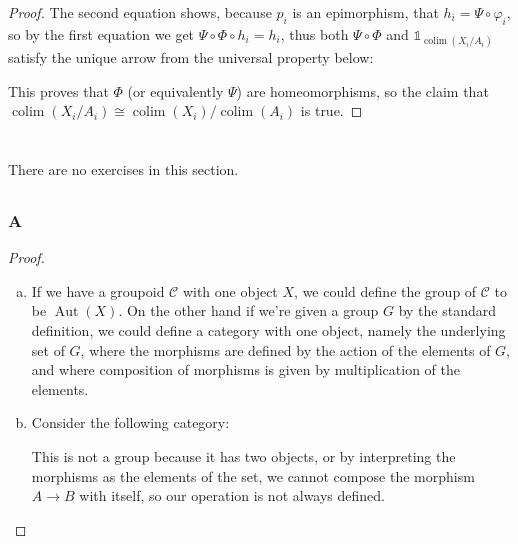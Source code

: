 \documentclass{article}
\newcommand{\altid}{\mathds{1}}
\DeclareMathOperator{\colim}{\mathrm{colim}}
\DeclareMathOperator{\Aut}{\mathrm{Aut}}
\begin{document}
\begin{proof}
    The second equation shows, because $p_i$ is an epimorphism, that $h_i=\Psi \circ \varphi_i$, so by the first equation we get $\Psi \circ \Phi\circ h_i=h_i$, thus both $\Psi \circ \Phi$ and $\altid_{\colim(X_i/A_i)}$ satisfy the unique arrow from the universal property below:
    \begin{center}
    \end{center}
    This proves that $\Phi$ (or equivalently $\Psi$) are homeomorphisms, so the claim that $\colim (X_i/A_i)\cong \colim (X_i)/\colim(A_i)$ is true.
    \end{proof}
\section{}
\subsection{}
There are no exercises in this section.
\subsection{}
\subsubsection{A}\label{1.2.A}
\begin{proof}
\begin{enumerate}[(a)]
    \item If we have a groupoid $\mathscr{C}$ with one object $X$, we could define the group of $\mathcal{C}$ to be $\Aut(X)$. On the other hand if we're given a group $G$ by the standard definition, we could define a category with one object, namely the underlying set of $G$, where the morphisms are defined by the action of the elements of $G$, and where composition of morphisms is given by multiplication of the elements.
    \item Consider the following category:
    \begin{center}
    \end{center}
    This is not a group because it has two objects, or by interpreting the morphisms as the elements of the set, we cannot compose the morphism $A\to B$ with itself, so our operation is not always defined.
\end{enumerate}
\end{proof}
\end{document}

